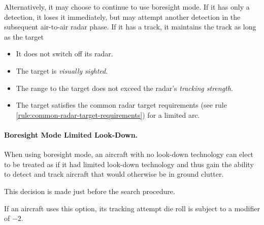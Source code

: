\begin{advancedrules}
{Alternatively, it may choose to continue to use boresight mode. If it has only a detection, it loses it immediately, but may attempt another detection in the subsequent air-to-air radar phase. If it has a track, it maintains the track as long as the target
\begin{itemize}
    \item It does not switch off its radar.
    \item The target is \emph{visually sighted}.
    \item The range to the target does not exceed the radar's \emph{tracking strength}.
    \item The target satisfies the common radar target requirements (see rule \ref{rule:common-radar-target-requirements}) for a limited arc.
\end{itemize}

\paragraph{Boresight Mode Limited Look-Down.}

When using boresight mode, an aircraft with no look-down technology can elect to be treated as if it had limited look-down technology and thus gain the ability to detect and track aircraft that would otherwise be in ground clutter.

This decision is made just before the search procedure. 

If an aircraft uses this option, its tracking attempt die roll is subject to a modifier of $-2$. 

}

\end{advancedrules}
